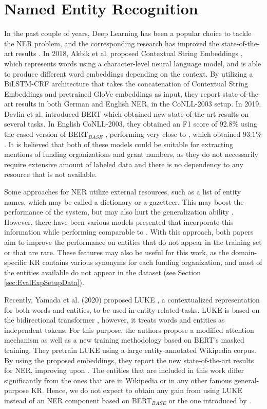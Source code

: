 \documentclass{report}
\theoremstyle{definition}
\theoremstyle{remark}
\begin{document}
\section{Named Entity Recognition}
\label{sota1}
In the past couple of years, Deep Learning has been a popular choice to tackle the NER problem, and the corresponding research has improved the state-of-the-art results \cite{NERsurvey}. In 2018, Akbik et al. proposed Contextual String Embeddings \cite{flairpaper}, which represents words using a character-level neural language model, and is able to produce different word embeddings depending on the context. By utilizing a BiLSTM-CRF architecture that takes the concatenation of Contextual String Embeddings and pretrained GloVe embeddings \cite{glove} as input, they report state-of-the-art results in both German and English NER, in the CoNLL-2003 \cite{conll} setup. In 2019, Devlin et al. introduced BERT \cite{BERT} which obtained new state-of-the-art results on several tasks. In English CoNLL-2003, they obtained an F1 score of $92.8\%$ using the cased version of BERT$_{BASE}$ \cite{BERT}, performing very close to \cite{flairpaper}, which obtained $93.1\%$. It is believed that both of these models could be suitable for extracting mentions of funding organizations and grant numbers, as they do not necessarily require extensive amount of labeled data and there is no dependency to any resource that is not available.

Some approaches for NER utilize external resources, such as a list of entity names, which may be called a dictionary or a gazetteer. This may boost the performance of the system, but may also hurt the generalization ability \cite{NERsurvey}. However, there have been various models presented \cite{NERgazetteer, NERDict} that incorporate this information while performing comparable to \cite{flairpaper}. With this approach, both papers \cite{NERgazetteer, NERDict} aim to improve the performance on entities that do not appear in the training set or that are rare. These features may also be useful for this work, as the domain-specific KR contains various synonyms for each funding organization, and most of the entities available do not appear in the dataset (see Section \ref{sec:EvalExpSetupData}).

Recently, Yamada et al. (2020) proposed LUKE \cite{LUKE}, a contextualized representation for both words and entities, to be used in entity-related tasks. LUKE is based on the bidirectional transformer \cite{transformer}, however, it treats words and entities as independent tokens. For this purpose, the authors propose a modified attention mechanism as well as a new training methodology based on BERT's masked training. They pretrain LUKE using a large entity-annotated Wikipedia corpus. By using the proposed embeddings, they report the new state-of-the-art results for NER, improving upon \cite{flairpaper}. The entities that are included in this work differ significantly from the ones that are in Wikipedia or in any other famous general-purpose KR. Hence, we do not expect to obtain any gain from using LUKE instead of an NER component based on BERT$_{BASE}$ or the one introduced by \cite{flairpaper}.
\end{document}
